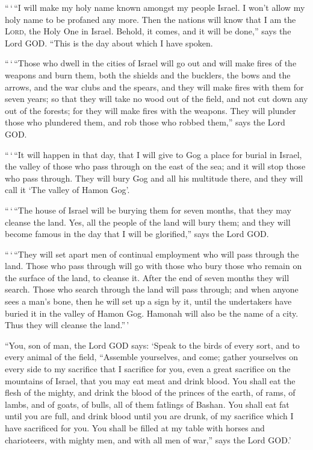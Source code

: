  ``\,`\,``I will make my holy name known amongst my people
Israel. I won't allow my holy name to be profaned any more. Then the
nations will know that I am the \textsc{Lord}, the Holy One in Israel.
 Behold, it comes, and it will be done,'' says the Lord
GOD. ``This is the day about which I have spoken.

 ``\,`\,``Those who dwell in the cities of Israel will go
out and will make fires of the weapons and burn them, both the shields
and the bucklers, the bows and the arrows, and the war clubs and the
spears, and they will make fires with them for seven years;
 so that they will take no wood out of the field, and not
cut down any out of the forests; for they will make fires with the
weapons. They will plunder those who plundered them, and rob those who
robbed them,'' says the Lord GOD.

 ``\,`\,``It will happen in that day, that I will give to
Gog a place for burial in Israel, the valley of those who pass through
on the east of the sea; and it will stop those who pass through. They
will bury Gog and all his multitude there, and they will call it `The
valley of Hamon Gog'.

 ``\,`\,``The house of Israel will be burying them for
seven months, that they may cleanse the land.  Yes, all
the people of the land will bury them; and they will become famous in
the day that I will be glorified,'' says the Lord GOD.

 ``\,`\,``They will set apart men of continual employment
who will pass through the land. Those who pass through will go with
those who bury those who remain on the surface of the land, to cleanse
it. After the end of seven months they will search. 
Those who search through the land will pass through; and when anyone
sees a man's bone, then he will set up a sign by it, until the
undertakers have buried it in the valley of Hamon Gog. 
Hamonah will also be the name of a city. Thus they will cleanse the
land.''\,'

 ``You, son of man, the Lord GOD says: `Speak to the
birds of every sort, and to every animal of the field, ``Assemble
yourselves, and come; gather yourselves on every side to my sacrifice
that I sacrifice for you, even a great sacrifice on the mountains of
Israel, that you may eat meat and drink blood.  You shall
eat the flesh of the mighty, and drink the blood of the princes of the
earth, of rams, of lambs, and of goats, of bulls, all of them fatlings
of Bashan.  You shall eat fat until you are full, and
drink blood until you are drunk, of my sacrifice which I have sacrificed
for you.  You shall be filled at my table with horses and
charioteers, with mighty men, and with all men of war,'' says the Lord
GOD.'

